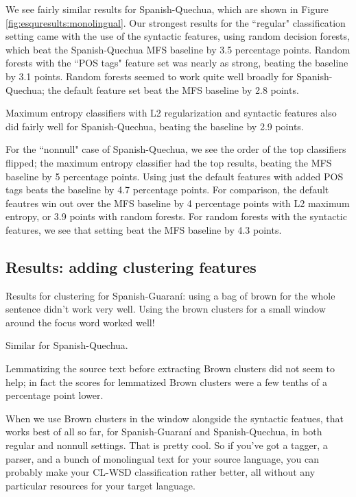 We see fairly similar results for Spanish-Quechua, which are shown in Figure
\ref{fig:esquresults:monolingual}. Our strongest results for the ``regular"
classification setting came with the use of the syntactic features, using
random decision forests, which beat the Spanish-Quechua MFS baseline by 3.5
percentage points. Random forests with the ``POS tags" feature set was nearly
as strong, beating the baseline by 3.1 points. Random forests seemed to work
quite well broadly for Spanish-Quechua; the default feature set beat the
MFS baseline by 2.8 points.

Maximum entropy classifiers with L2 regularization and syntactic features also
did fairly well for Spanish-Quechua, beating the baseline by 2.9 points.

For the ``nonnull" case of Spanish-Quechua, we see the order of the top
classifiers flipped; the maximum entropy classifier had the top results,
beating the MFS baseline by 5 percentage points. Using just the default
features with added POS tags beats the baseline by 4.7 percentage points. For
comparison, the default feautres win out over the MFS baseline by 4 percentage
points with L2 maximum entropy, or 3.9 points with random forests. For random
forests with the syntactic features, we see that setting beat the MFS baseline
by 4.3 points.


\subsection{Results: adding clustering features}
Results for clustering for Spanish-Guaraní:
using a bag of brown for the whole sentence didn't work very well.
Using the brown clusters for a small window around the focus word worked well!

Similar for Spanish-Quechua.

Lemmatizing the source text before extracting
Brown clusters did not seem to help; in fact the scores for lemmatized Brown
clusters were a few tenths of a percentage point lower.  

When we use Brown clusters in the window alongside the syntactic featues, that
works best of all so far, for Spanish-Guaraní and Spanish-Quechua, in both
regular and nonnull settings. That is pretty cool. So if you've got a tagger,
a parser, and a bunch of monolingual text for your source language, you can
probably make your CL-WSD classification rather better, all without any
particular resources for your target language.

